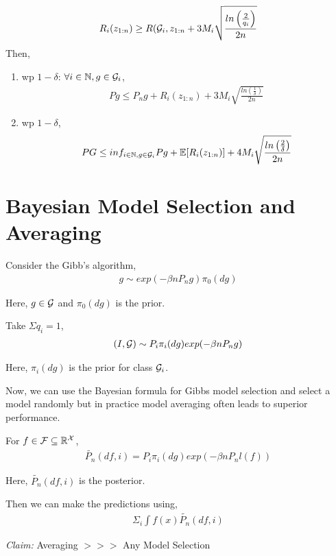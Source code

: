 \documentclass[twoside]{article}
\begin{document}
\begin{theorem}
    \begin{align*}
        R_i(z_{1:n}) \geq R(\mathcal{G}_i, z_{1:n} + 3M_i\sqrt{\frac{ln\left(\frac{2}{q_i}\right)}{2n}}
    \end{align*}
    Then,
    \begin{enumerate}
        \item wp $1-\delta$: $\forall i \in \mathbb{N}, g \in \mathcal{G}_i$,
        \begin{align*}
            Pg \leq P_n g + R_i(z_{1:n}) + 3M_i\sqrt{\frac{ln\left(\frac{1}{\delta}\right)}{2n}}
        \end{align*}
        \item wp $1-\delta$,
        \begin{align*}
            PG \leq inf_{i \in \mathbb{N}, g \in \mathcal{G}_i} Pg + \mathbb{E}[R_i(z_{1:n})] + 4M_i\sqrt{\frac{ln\left(\frac{2}{\delta}\right)}{2n}}
        \end{align*}
    \end{enumerate}
\end{theorem}

\section{Bayesian Model Selection and Averaging}
Consider the Gibb's algorithm,
\begin{align*}
    g \sim exp(-\beta n P_n g) \pi_0(dg)
\end{align*}

Here, $g \in \mathcal{G}$ and $\pi_0(dg)$ is the prior.

Take $\Sigma q_i = 1$,
\begin{align*}
    (I, \mathcal{G}) \sim P_i \pi_i(dg) exp(-\beta n P_n g)
\end{align*}

Here, $\pi_i(dg)$ is the prior for class $\mathcal{G}_i$.

Now, we can use the Bayesian formula for Gibbs model selection and select a model randomly but in practice model averaging often leads to superior performance.

For $f \in \mathcal{F} \subseteq \mathbb{R}^{\mathcal{X}}$,
\begin{align*}
    \tilde{P_n}(df, i) = P_i \pi_i(dg) exp(-\beta n P_n l(f))
\end{align*}

Here, $\tilde{P_n}(df, i)$ is the posterior.

Then we can make the predictions using,
\begin{align*}
    \Sigma_i \int f(x) \tilde{P_n}(df, i)
\end{align*}

\textit{Claim:} Averaging $>>>$ Any Model Selection

\end{document}
